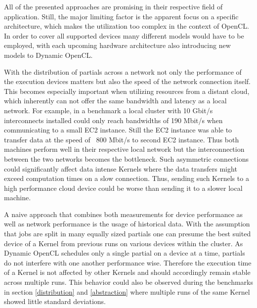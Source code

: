 All of the presented approaches are promising in their respective field of application. Still, the major limiting factor is the apparent focus on a specific architecture, which makes the utilization too complex in the context of OpenCL. In order to cover all supported devices many different models would have to be employed, with each upcoming hardware architecture also introducing new models to Dynamic OpenCL.

With the distribution of partials across a network not only the performance of the execution devices matters but also the speed of the network connection itself. This becomes especially important when utilizing resources from a distant cloud, which inherently can not offer the same bandwidth and latency as a local network. For example, in a benchmark a local cluster with 10 Gbit/s interconnects installed could only reach bandwidths of 190 Mbit/s when communicating to a small EC2 instance. Still the EC2 instance was able to transfer data at the speed of ~800 Mbit/s to second EC2 instance. Thus both machines perform well in their respective local network but the interconnection between the two networks becomes the bottleneck. Such asymmetric connections could significantly affect data intense Kernels where the data transfers might exceed computation times on a slow connection. Thus, sending such Kernels to a high performance cloud device could be worse than sending it to a slower local machine.

A naive approach that combines both measurements for device performance as well as network performance is the usage of historical data. With the assumption that jobs are split in many equally sized partials one can presume the best suited device of a Kernel from previous runs on various devices within the cluster. As Dynamic OpenCL schedules only a single partial on a device at a time, partials do not interfere with one another performance wise. Therefore the execution time of a Kernel is not affected by other Kernels and should accordingly remain stable across multiple runs. This behavior could also be observed during the benchmarks in section \ref{distribution} and \ref{abstraction} where multiple runs of the same Kernel showed little standard deviations.

